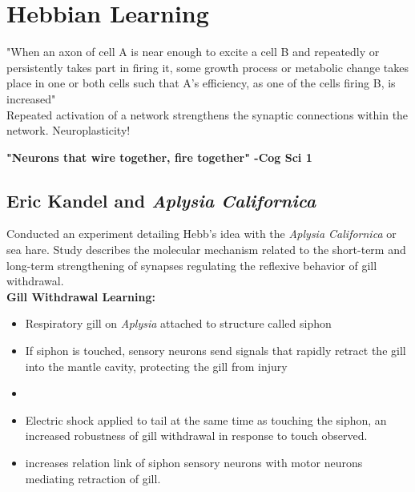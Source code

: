 \documentclass{article}
\begin{document}
\newpage
\section{Hebbian Learning}
"When an axon of cell A is near enough to excite a cell B and repeatedly or persistently takes part in firing it, some growth process or metabolic change takes place in one or both cells such that A's efficiency, as one of the cells firing B, is increased" \\ 

Repeated activation of a network strengthens the synaptic connections within the network. Neuroplasticity!\\
\begin{center} 
\textbf{"Neurons that wire together, fire together" -Cog Sci 1}
\end{center}

\subsection{Eric Kandel and \textit{Aplysia Californica}}
Conducted an experiment detailing Hebb's idea with the \textit{Aplysia Californica} or sea hare. Study describes the molecular mechanism related to the short-term and long-term strengthening of synapses regulating the reflexive behavior of gill withdrawal. \\ 

\noindent \textbf{Gill Withdrawal Learning:} 
\begin{itemize}
    \item Respiratory gill on \textit{Aplysia} attached to structure called siphon
    \item If siphon is touched, sensory neurons send signals that rapidly retract the gill into the mantle cavity, protecting the gill from injury
    \item 
    \item Electric shock applied to tail at the same time as touching the siphon, an increased robustness of gill withdrawal in response to touch observed. 
    \item increases relation link of siphon sensory neurons with motor neurons mediating retraction of gill. 
\end{itemize}
\end{document}
